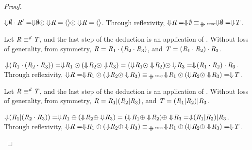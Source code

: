\documentclass[numbers,10pt,preprint\ifanon ,nocopyrightspace\fi]{sigplanconf}
\begin{document}
\begin{proof}
\begin{case}[\EmptyProjectionLeftRule{}]
    $\Downarrow\mkern-4mu \emptyset \cdot \mathit{R}' = \Downarrow\mkern-4mu \emptyset \odot
    \Downarrow\mkern-4mu \mathit{R} = \langle\rangle \odot \Downarrow\mkern-4mu \mathit{R} =
    \langle\rangle$.  Through reflexivity, $\ToDNFRegexOf{\Regex} =
    \ToDNFRegexOf{\emptyset} \EquivalenceOf{\ParallelRewriteSwap}
    \ToDNFRegexOf{\emptyset} = \ToDNFRegexOf{\RegexAlt}$.
  \end{case}

  \begin{case}[\ConcatAssocRule{}]
    Let $\mathit{R} \equiv^d \mathit{T}$, and the last step of the
    deduction is an application of \ConcatAssocRule{}.  Without loss of
    generality, from symmetry,
    $\mathit{R} = \mathit{R}_1 \cdot (\mathit{R}_2 \cdot \mathit{R}_3)$, and
    $\mathit{T} = (\mathit{R}_1 \cdot \mathit{R}_2) \cdot \mathit{R}_3$.

    $\Downarrow\mkern-4mu (\mathit{R}_1 \cdot (\mathit{R}_2 \cdot \mathit{R}_3)) =
    \Downarrow\mkern-4mu \mathit{R}_1 \odot (\Downarrow\mkern-4mu \mathit{R}_2 \odot
    \Downarrow\mkern-4mu \mathit{R}_3) =
    (\Downarrow\mkern-4mu \mathit{R}_1 \odot \Downarrow\mkern-4mu \mathit{R}_2) \odot
    \Downarrow\mkern-4mu \mathit{R}_3 =
    \Downarrow\mkern-4mu (\mathit{R}_1 \cdot \mathit{R}_2) \cdot \mathit{R}_3$.  Through
    reflexivity, $\ToDNFRegexOf{\Regex} = \ToDNFRegexOf{\Regex_1} \ConcatDNF
    (\ToDNFRegexOf{\Regex_2} \ConcatDNF \ToDNFRegexOf{\Regex_3})
    \EquivalenceOf{\ParallelRewriteSwap} \ToDNFRegexOf{\Regex_1} \ConcatDNF
    (\ToDNFRegexOf{\Regex_2} \ConcatDNF \ToDNFRegexOf{\Regex_3}) =
    \ToDNFRegexOf{\RegexAlt}$.
  \end{case}
  
  \begin{case}[\OrAssociativityRule{}]
    Let $\mathit{R} \equiv^d \mathit{T}$, and the last step of the
    deduction is an application of \OrAssociativityRule{}.  Without loss of
    generality, from symmetry,
    $\mathit{R} = \mathit{R}_1 | (\mathit{R}_2 | \mathit{R}_3)$, and
    $\mathit{T} = (\mathit{R}_1 | \mathit{R}_2) | \mathit{R}_3$.

    $\Downarrow\mkern-4mu (\mathit{R}_1 | (\mathit{R}_2 \cdot \mathit{R}_3)) =
    \Downarrow\mkern-4mu \mathit{R}_1 \oplus (\Downarrow\mkern-4mu \mathit{R}_2 \oplus
    \Downarrow\mkern-4mu \mathit{R}_3) =
    (\Downarrow\mkern-4mu \mathit{R}_1 \oplus \Downarrow\mkern-4mu \mathit{R}_2) \oplus
    \Downarrow\mkern-4mu \mathit{R}_3 =
    \Downarrow\mkern-4mu (\mathit{R}_1 | \mathit{R}_2) | \mathit{R}_3$.  Through
    reflexivity, $\ToDNFRegexOf{\Regex} = \ToDNFRegexOf{\Regex_1} \OrDNF
    (\ToDNFRegexOf{\Regex_2} \OrDNF \ToDNFRegexOf{\Regex_3})
    \EquivalenceOf{\ParallelRewriteSwap} \ToDNFRegexOf{\Regex_1} \OrDNF
    (\ToDNFRegexOf{\Regex_2} \OrDNF \ToDNFRegexOf{\Regex_3}) =
    \ToDNFRegexOf{\RegexAlt}$.
  \end{case}


\end{proof}
\end{document}
